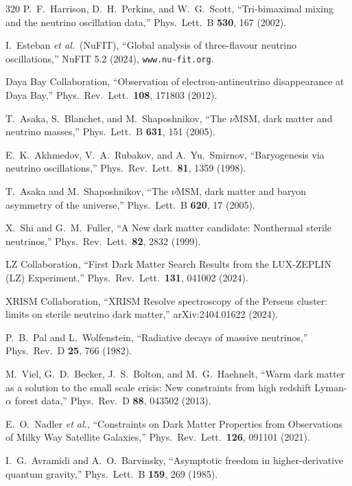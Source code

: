 \begin{thebibliography}{320}
P.~F.~Harrison, D.~H.~Perkins, and W.~G.~Scott,
``Tri-bimaximal mixing and the neutrino oscillation data,''
Phys.\ Lett.\ B \textbf{530}, 167 (2002).

I.~Esteban \emph{et al.}\ (NuFIT),
``Global analysis of three-flavour neutrino oscillations,''
NuFIT 5.2 (2024), \texttt{www.nu-fit.org}.

Daya Bay Collaboration,
``Observation of electron-antineutrino disappearance at Daya Bay,''
Phys.\ Rev.\ Lett.\ \textbf{108}, 171803 (2012).

T.~Asaka, S.~Blanchet, and M.~Shaposhnikov,
``The $\nu$MSM, dark matter and neutrino masses,''
Phys.\ Lett.\ B \textbf{631}, 151 (2005).

E.~K.~Akhmedov, V.~A.~Rubakov, and A.~Yu.~Smirnov,
``Baryogenesis via neutrino oscillations,''
Phys.\ Rev.\ Lett.\ \textbf{81}, 1359 (1998).

T.~Asaka and M.~Shaposhnikov,
``The $\nu$MSM, dark matter and baryon asymmetry of the universe,''
Phys.\ Lett.\ B \textbf{620}, 17 (2005).

X.~Shi and G.~M.~Fuller,
``A New dark matter candidate: Nonthermal sterile neutrinos,''
Phys.\ Rev.\ Lett.\ \textbf{82}, 2832 (1999).

LZ Collaboration,
``First Dark Matter Search Results from the LUX-ZEPLIN (LZ) Experiment,''
Phys.\ Rev.\ Lett.\ \textbf{131}, 041002 (2024).

XRISM Collaboration,
``XRISM Resolve spectroscopy of the Perseus cluster: limits on sterile neutrino dark matter,''
arXiv:2404.01622 (2024).

P.~B.~Pal and L.~Wolfenstein,
``Radiative decays of massive neutrinos,''
Phys.\ Rev.\ D \textbf{25}, 766 (1982).

M.~Viel, G.~D.~Becker, J.~S.~Bolton, and M.~G.~Haehnelt,
``Warm dark matter as a solution to the small scale crisis: New constraints from high redshift Lyman-$\alpha$ forest data,''
Phys.\ Rev.\ D \textbf{88}, 043502 (2013).

E.~O.~Nadler \textit{et al.},
``Constraints on Dark Matter Properties from Observations of Milky Way Satellite Galaxies,''
Phys.\ Rev.\ Lett.\ \textbf{126}, 091101 (2021).

I.~G.~Avramidi and A.~O.~Barvinsky,
``Asymptotic freedom in higher-derivative quantum gravity,''
Phys.\ Lett.\ B \textbf{159}, 269 (1985).


\end{thebibliography}
